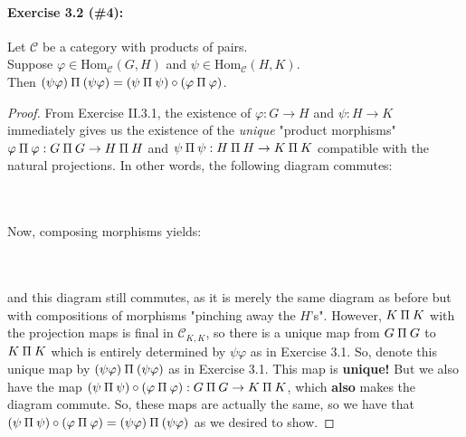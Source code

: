 \documentclass[12pt,letterpaper]{article}
\newcommand{\invamalg}{\mathbin{\text{\rotatebox[origin=c]{180}{$\amalg$}}}}
\newcommand{\Hom}{\mathrm{Hom}}
\begin{document}
\pagebreak
\paragraph{Exercise 3.2 (\#4):} Let  $\mathscr{C}$ be a category with products of pairs.\\
Suppose $\varphi \in \Hom_{\mathscr{C}}(G,H)$ and $\psi \in \Hom_{\mathscr{C}}(H,K)$.\\
Then $(\psi\varphi)\invamalg(\psi\varphi) = (\psi\invamalg\psi)\circ(\varphi\invamalg\varphi)$.

\begin{proof} 
From Exercise II.3.1, the existence of $\varphi: G\rightarrow H$ and $\psi:H \rightarrow K$ immediately gives us the existence of the \textit{unique} "product morphisms" $\varphi\invamalg\varphi: G\invamalg G\rightarrow H\invamalg H$ and $\psi\invamalg\psi:H\invamalg H \rightarrow K\invamalg  K$ compatible with the natural projections. In other words, the following diagram commutes:\\

\\\\

	Now, composing morphisms yields:\\
	\\\\
and this diagram still commutes, as it is merely the same diagram as before but with compositions of morphisms "pinching away the $H$'s". However, $K\invamalg K$ with the projection maps is final in $\mathscr{C}_{K,K}$, so there is a unique map from $G\invamalg G$ to $K\invamalg K$ which is entirely determined by $\psi\varphi$ as in Exercise 3.1. So, denote this unique map by $(\psi\varphi)\invamalg(\psi\varphi)$ as in Exercise 3.1. This map is \textbf{unique!} But we also have the map $(\psi\invamalg\psi)\circ(\varphi\invamalg\varphi) : G\invamalg G \rightarrow K\invamalg K$, which \textbf{also} makes the diagram commute. So, these maps are actually the same, so we have that $(\psi\invamalg\psi)\circ(\varphi\invamalg\varphi) = (\psi\varphi)\invamalg(\psi\varphi)$ as we desired to show.
\end{proof}
\end{document}
